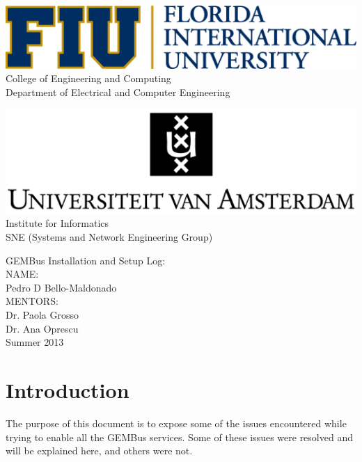 \documentclass[12 pt, twoside]{article}
\begin{document}
	\begin{titlepage}		
		\begin{center}
			\includegraphics[width = 6.0 in]{FIU_Logo.jpg} \\[0.2 in]
			
			\Large
			{
				College of Engineering and Computing \\[0.05 in]
				Department of Electrical and Computer Engineering \\[0.5 in]
			}
			
			\includegraphics[width = 5.0 in]{UVA_Logo} \\[0.1 in]
			
			\Large
			{
				Institute for Informatics \\[0.05 in]
				SNE (Systems and Network Engineering Group) \\[0.5 in]
			}
			
			\textnormal{\Huge GEMBus Installation and Setup Log:} \\[0.4 in]
			
			\Large
			{
				\noindent NAME: \\
				Pedro D Bello-Maldonado \\[0.2 in]
				MENTORS: \\
				Dr. Paola Grosso \\
				Dr. Ana Oprescu \\[0.4 in]
				Summer 2013 
			}
		\end{center}
	\end{titlepage}
	
	\section{Introduction}
	{
		The purpose of this document is to expose some of the issues encountered while trying to enable all the GEMBus services. Some of these issues were resolved and will be explained here, and others were not. 
	}
	
\end{document}
